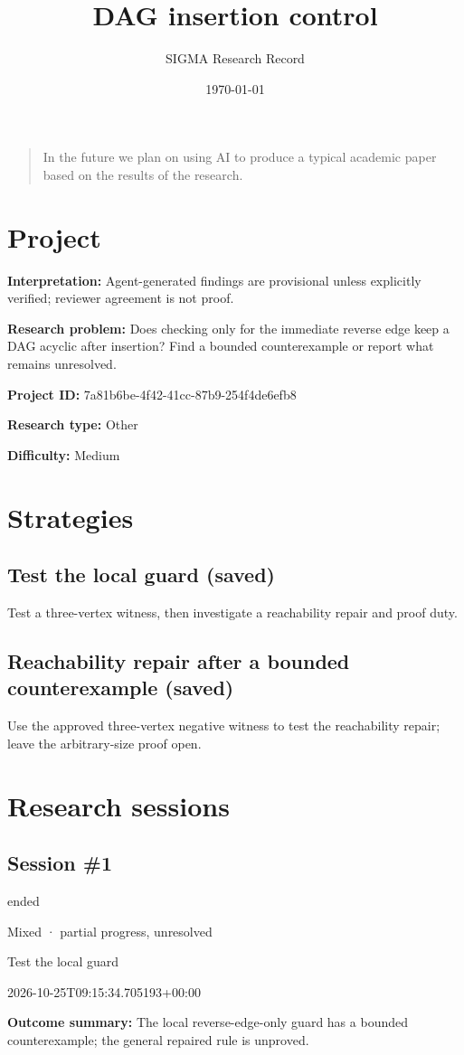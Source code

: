 \documentclass[11pt]{article}
\title{DAG insertion control}
\author{SIGMA Research Record}
\date{\today}
\begin{document}
\maketitle
\begin{quote}\small In the future we plan on using AI to produce a typical academic paper based on the results of the research.\end{quote}
\section{Project}
\textbf{Interpretation:} Agent-generated findings are provisional unless explicitly verified; reviewer agreement is not proof.\par
\textbf{Research problem:} Does checking only for the immediate reverse edge keep a DAG acyclic after insertion? Find a bounded counterexample or report what remains unresolved.\par
\textbf{Project ID:} 7a81b6be-4f42-41cc-87b9-254f4de6efb8\par
\textbf{Research type:} Other\par
\textbf{Difficulty:} Medium\par
\section{Strategies}
\subsection{Test the local guard (saved)}
Test a three-vertex witness, then investigate a reachability repair and proof duty.\par
\subsection{Reachability repair after a bounded counterexample (saved)}
Use the approved three-vertex negative witness to test the reachability repair; leave the arbitrary-size proof open.\par
\section{Research sessions}
\subsection{Session \#1}
\begin{description}[style=nextline,font=\normalfont\bfseries,leftmargin=0pt,labelsep=0pt]
\item[Execution status] ended
\item[Outcome] Mixed · partial progress, unresolved
\item[Strategy] Test the local guard
\item[Started] 2026-10-25T09:15:34.705193+00:00
\end{description}
\textbf{Outcome summary:} The local reverse-edge-only guard has a bounded counterexample; the general repaired rule is unproved.\par
\end{document}
